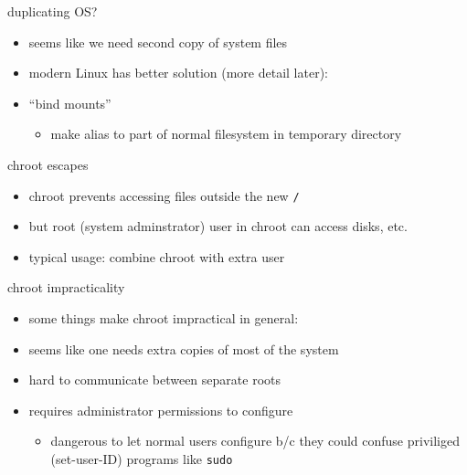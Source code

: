 \begin{frame}{duplicating OS?}
    \begin{itemize}
    \item seems like we need second copy of system files
    \vspace{.5cm}
    \item modern Linux has better solution (more detail later):
    \item ``bind mounts''
        \begin{itemize}
        \item make alias to part of normal filesystem in temporary directory
        \end{itemize}
    \end{itemize}
\end{frame}

\begin{frame}{chroot escapes}
    \begin{itemize}
    \item chroot prevents accessing files outside the new \texttt{/}
    \item but root (system adminstrator) user in chroot can access disks, etc.
    \vspace{.5cm}
    \item typical usage: combine chroot with extra user
    \end{itemize}
\end{frame}

\begin{frame}{chroot impracticality}
    \begin{itemize}
    \item some things make chroot impractical in general:
    \vspace{.5cm}
    \item seems like one needs extra copies of most of the system
    \item hard to communicate between separate roots
    \item requires administrator permissions to configure
        \begin{itemize}
        \item dangerous to let normal users configure b/c they could confuse priviliged (set-user-ID) programs like \texttt{sudo}
        \end{itemize}
    \end{itemize}
\end{frame}

